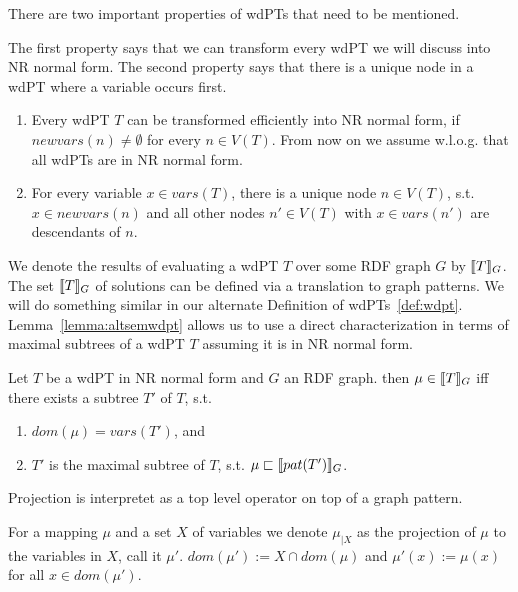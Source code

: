 There are two important properties of wdPTs that need to be mentioned. 
\begin{proposition}
The first property says that we can transform every wdPT we will discuss into NR
normal form. The second property says that there is a unique node in a wdPT where a
variable occurs first.
	\begin{enumerate}	
		\item Every wdPT $T$ can be transformed efficiently into NR normal form, 
			if $newvars(n) \neq	\emptyset$ for every $n \in V(T)$. From now on we
			assume w.l.o.g. that all wdPTs are in NR normal form.

		\item For every variable $x \in vars (T)$, there is a unique node $n \in
			V(T)$, s.t. $x \in newvars(n)$ and all other nodes $n' \in V(T)$
			with $x \in vars(n')$ are descendants of $n$.
	\end{enumerate}
\end{proposition}


We denote the results of evaluating a wdPT $T$ over some RDF graph $G$ by $\llbracket T
\rrbracket_G$. The set $\llbracket T \rrbracket_G$ of solutions can be defined via a translation to
graph patterns. We will do something similar in our alternate Definition of
wdPTs~\ref{def:wdpt}. Lemma~\ref{lemma:altsemwdpt} allows us to use a direct
characterization in terms of maximal subtrees of a wdPT $T$ assuming it is in NR
normal form.

\begin{lemma}\label{lemma:altsemwdpt}
	Let $T$ be a wdPT in NR normal form and $G$ an RDF graph. then $\mu \in
	\llbracket T\rrbracket_G$ iff there exists a subtree $T'$ of $T$, s.t. 
	\begin{enumerate}
		\item  $dom(\mu) = vars(T')$, and
		\item $T'$ is the maximal subtree of $T$, s.t. $\mu \sqsubset \llbracket
			pat(T') \rrbracket_G$.
	\end{enumerate}
\end{lemma}

Projection is interpretet as a top level operator on top of a graph pattern.
\begin{definition}
For a mapping $\mu$ and a set $X$ of variables we denote $\mu_{|X}$ as the
projection of $\mu$ to the variables in $X$, call it $\mu'$. $dom(\mu'):=X \cap
dom(\mu)$ and $\mu'(x) := \mu(x)$ for all $x \in dom(\mu')$.
\end{definition}

